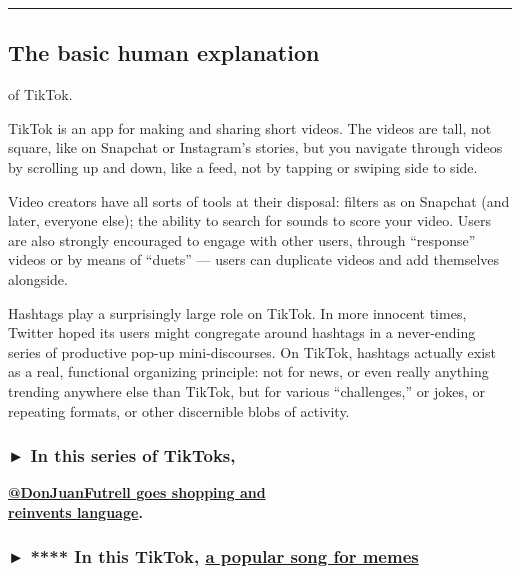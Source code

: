 \begin{center}\rule{0.5\linewidth}{\linethickness}\end{center}

\hypertarget{the-basic-human-explanation}{%
\subsection{The basic human
explanation}\label{the-basic-human-explanation}}

of TikTok.

TikTok is an app for making and sharing short videos. The videos are
tall, not square, like on Snapchat or Instagram's stories, but you
navigate through videos by scrolling up and down, like a feed, not by
tapping or swiping side to side.

Video creators have all sorts of tools at their disposal: filters as on
Snapchat (and later, everyone else); the ability to search for sounds to
score your video. Users are also strongly encouraged to engage with
other users, through ``response'' videos or by means of ``duets'' ---
users can duplicate videos and add themselves alongside.

Hashtags play a surprisingly large role on TikTok. In more innocent
times, Twitter hoped its users might congregate around hashtags in a
never-ending series of productive pop-up mini-discourses. On TikTok,
hashtags actually exist as a real, functional organizing principle: not
for news, or even really anything trending anywhere else than TikTok,
but for various ``challenges,'' or jokes, or repeating formats, or other
discernible blobs of activity.

\hypertarget{-in-this-series-of-tiktoks}{%
\subsubsection{\texorpdfstring{► \textbf{In this series of
TikToks,}}{► In this series of TikToks,}}\label{-in-this-series-of-tiktoks}}

\textbf{\href{https://www.tiktok.com/share/video/6666202402800012550}{@DonJuanFutrell
goes shopping and}}\\
\textbf{\href{https://www.tiktok.com/share/video/6666202402800012550}{reinvents
language}.}

\hypertarget{--in-this-tiktok-a-popular-song-for-memes}{%
\subsubsection{\texorpdfstring{► **** In this TikTok,
\href{https://www.tiktok.com/share/video/6664754374910151941}{a popular
song for
memes}}{► **** In this TikTok, a popular song for memes}}\label{--in-this-tiktok-a-popular-song-for-memes}}

